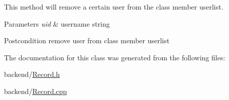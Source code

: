 This method will remove a certain user from the class member userlist. 
\begin{DoxyParams}{Parameters}
{\em uid} & username string \\
\hline
\end{DoxyParams}
\begin{DoxyPostcond}{Postcondition}
remove user from class member userlist 
\end{DoxyPostcond}


The documentation for this class was generated from the following files\+:\begin{DoxyCompactItemize}
\item 
backend/\mbox{\hyperlink{_record_8h}{Record.\+h}}\item 
backend/\mbox{\hyperlink{_record_8cpp}{Record.\+cpp}}\end{DoxyCompactItemize}
